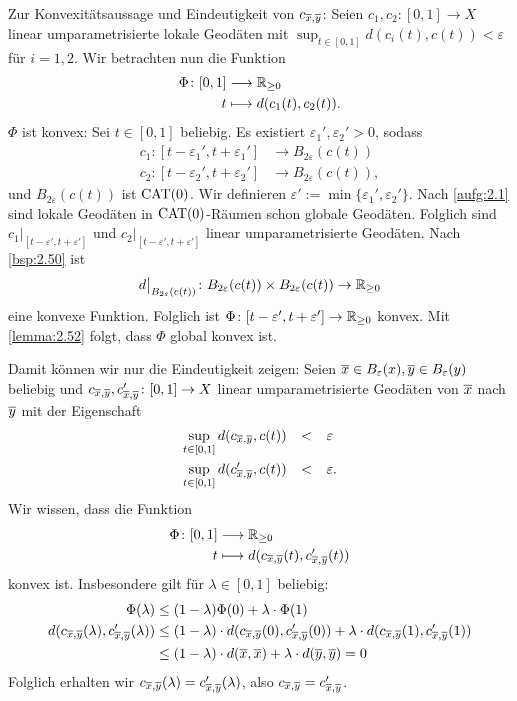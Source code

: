 \begin{beweis}
	Zur Konvexitätsaussage und Eindeutigkeit von $c_{\overline{x},\overline{y}}$:
	Seien $c_1,c_2 \colon [0,1] \rightarrow X$ linear umparametrisierte lokale Geodäten mit $\sup_{t \in [0,1]} d(c_i(t),c(t)) < \varepsilon$ für $i = 1,2$.
	Wir betrachten nun die Funktion
	\begin{align*}
		\Phi\colon [0,1] &\longrightarrow \mathbb{R}_{\geq 0} \\
		t &\longmapsto d(c_1(t),c_2(t)).
	\end{align*}
	$\Phi$ ist konvex:
	Sei $t \in [0,1]$ beliebig.
	Es existiert $\varepsilon_1', \varepsilon_2' > 0$, sodass
	\begin{align*}
		c_1 \colon [t- \varepsilon_1', t+ \varepsilon_1'] &\longrightarrow B_{2\varepsilon}(c(t)) \\
		c_2 \colon [t-\varepsilon_2', t+\varepsilon_2'] &\longrightarrow B_{2\varepsilon}(c(t)),
	\end{align*}
	und $B_{2\varepsilon}(c(t))$ ist $\operatorname{CAT(0)}$.
	Wir definieren $\varepsilon' := \min\{ \varepsilon_1',\varepsilon_2'\}$.
	Nach \autoref{aufg:2.1} sind lokale Geodäten in $\operatorname{CAT(0)}$-Räumen schon globale Geodäten.
	Folglich sind  $c_1 \big|_{[t-\varepsilon',t+\varepsilon']}$ und $c_2 \big|_{[t-\varepsilon',t+\varepsilon']}$ linear umparametrisierte Geodäten.
	Nach \autoref{bsp:2.50} ist
	\[
	d \big|_{B_{2\varepsilon}(c(t))} \colon B_{2\varepsilon}(c(t)) \times B_{2\varepsilon}(c(t)) \rightarrow \mathbb{R}_{\geq 0}
	\]
	eine konvexe Funktion. Folglich ist $\Phi \colon [t- \varepsilon',t+\varepsilon'] \rightarrow \mathbb{R}_{\geq 0}$ konvex.
	Mit \autoref{lemma:2.52} folgt, dass $\Phi$ global konvex ist.
	
	Damit können wir nur die Eindeutigkeit zeigen:
	Seien $\overline{x} \in B_\varepsilon(x), \overline{y} \in B_\varepsilon(y)$ beliebig und $c_{\overline{x},\overline{y}}, c_{\overline{x},\overline{y}}' \colon [0,1] \rightarrow X$ linear umparametrisierte Geodäten von $\overline{x}$ nach $\overline{y}$ mit der Eigenschaft
	\begin{align*}
		\sup_{t\in [0,1]} d(c_{\ol{x},\ol{y}}, c(t)) &\stack{}{<} \varepsilon \\
		\sup_{t \in [0,1]} d(c_{\ol{x},\ol{y}}',c(t)) &\stack{}{<} \varepsilon.
	\end{align*}
	Wir wissen, dass die Funktion
	\begin{align*}
		\Phi\colon [0,1] &\longrightarrow \mathbb{R}_{\geq 0} \\
		t &\longmapsto d(c_{\overline{x},\overline{y}}(t),c_{\overline{x},\overline{y}}'(t))
	\end{align*}
	konvex ist. \newpage
	Insbesondere gilt für $\lambda \in [0,1]$ beliebig:
	\begin{align*}
		\Phi(\lambda) &\leq (1-\lambda) \Phi(0) + \lambda \cdot \Phi(1) \\
		d(c_{\overline{x},\overline{y}}(\lambda),c_{\overline{x},\overline{y}}'(\lambda)) &\leq (1-\lambda) \cdot d(c_{\overline{x},\overline{y}}(0),c_{\overline{x},\overline{y}}'(0)) + \lambda \cdot d(c_{\overline{x},\overline{y}}(1),c_{\overline{x},\overline{y}}'(1)) \\
		&\leq (1-\lambda) \cdot d(\overline{x},\overline{x}) + \lambda \cdot d(\overline{y},\overline{y}) = 0
	\end{align*}
	Folglich erhalten wir $c_{\overline{x},\overline{y}}(\lambda) = c_{\overline{x},\overline{y}}'(\lambda)$, also $c_{\overline{x},\overline{y}} = c_{\overline{x},\overline{y}}'$.
					

\end{beweis}
